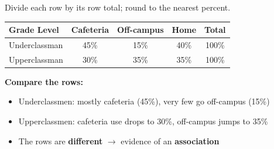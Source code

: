 \documentclass[aspectratio=169, 11pt]{beamer}
\begin{document}
{
\begin{frame}[t, plain]
  \hspace{0.4cm}%
  \begin{minipage}{0.93\textwidth}
    \vspace{0.3cm}
    \small
    Divide each row by its row total; round to the nearest percent.

    \vspace{0.3cm}
    \renewcommand{\arraystretch}{1.8}
    \begin{tabular}{l cccc}
    \rowcolor{sky}
    \textbf{Grade Level} & \textbf{Cafeteria} & \textbf{Off-campus} & \textbf{Home} & \textbf{Total} \\
    \hline
    Underclassman & 45\% & 15\% & 40\% & 100\% \\
    Upperclassman & 30\% & 35\% & 35\% & 100\% \\
    \end{tabular}

    \vspace{0.5cm}
    \textbf{Compare the rows:}
    \begin{itemize}\setlength{\itemsep}{0.3em}
      \item Underclassmen: mostly cafeteria (45\%), very few go off-campus (15\%)
      \item Upperclassmen: cafeteria use drops to 30\%, off-campus jumps to 35\%
      \item The rows are \textbf{different} $\to$ evidence of an \textbf{association}
    \end{itemize}
  \end{minipage}
\end{frame}
}
\end{document}
